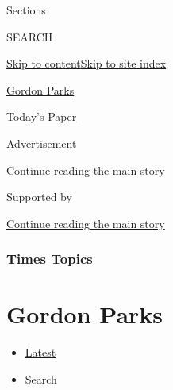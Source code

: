 Sections

SEARCH

\protect\hyperlink{site-content}{Skip to
content}\protect\hyperlink{site-index}{Skip to site index}

\href{https://www.nytimes.com/topic/person/gordon-parks}{Gordon Parks}

\href{https://myaccount.nytimes.com/auth/login?response_type=cookie\&client_id=vi}{}

\href{https://www.nytimes.com/section/todayspaper}{Today's Paper}

Advertisement

\protect\hyperlink{after-top}{Continue reading the main story}

Supported by

\protect\hyperlink{after-sponsor}{Continue reading the main story}

\hypertarget{times-topics}{%
\subsubsection{\texorpdfstring{\href{/index.html}{Times
Topics}}{Times Topics}}\label{times-topics}}

\hypertarget{gordon-parks}{%
\section{Gordon Parks}\label{gordon-parks}}

\begin{itemize}
\tightlist
\item
  \protect\hyperlink{stream-panel}{Latest}
\item
  Search
\end{itemize}

